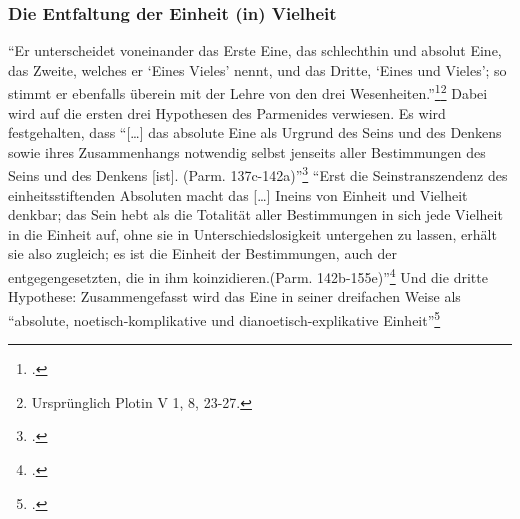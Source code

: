 \subsubsection{Die Entfaltung der Einheit (in) Vielheit}
\enquote{Er unterscheidet voneinander das Erste Eine, das schlechthin und absolut Eine, das Zweite, welches er \enquote{Eines Vieles} nennt, und das Dritte, \enquote{Eines und Vieles}; so stimmt er ebenfalls überein mit der Lehre von den drei Wesenheiten.}\footcite[][S. 187f.]{halfwassenaufstieg2006}\footnote{Ursprünglich Plotin V 1, 8, 23-27.}
Dabei wird auf die ersten drei Hypothesen des Parmenides verwiesen. Es wird festgehalten, dass \enquote{[\dots] das absolute Eine als Urgrund des Seins und des Denkens sowie ihres Zusammenhangs notwendig selbst jenseits aller Bestimmungen des Seins und des Denkens [ist]. (Parm. 137c-142a)}\footcite[vgl.][S. 188f.]{halfwassenaufstieg2006}
\enquote{Erst die Seinstranszendenz des einheitsstiftenden Absoluten macht das [\dots] Ineins von Einheit und Vielheit denkbar; das Sein hebt als die Totalität aller Bestimmungen in sich jede Vielheit in die Einheit auf, ohne sie in Unterschiedslosigkeit untergehen zu lassen, erhält sie also zugleich; es ist die Einheit der Bestimmungen, auch der entgegengesetzten, die in ihm koinzidieren.(Parm. 142b-155e)}\footcite[vgl.][S. 189]{halfwassenaufstieg2006}
Und die dritte Hypothese:
Zusammengefasst wird das Eine in seiner dreifachen Weise als \enquote{absolute, noetisch-komplikative und dianoetisch-explikative Einheit}\footcite[][S. 190]{halfwassenaufstieg2006} 
